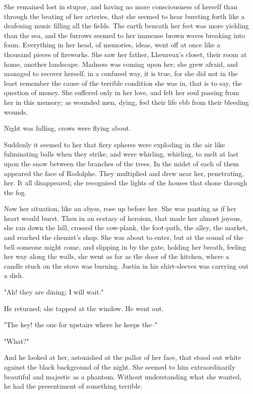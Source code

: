 \documentclass{tufte-book}
\begin{document}
She remained lost in stupor, and having no more consciousness of herself
than through the beating of her arteries, that she seemed to hear
bursting forth like a deafening music filling all the fields. The earth
beneath her feet was more yielding than the sea, and the furrows seemed
to her immense brown waves breaking into foam. Everything in her
head, of memories, ideas, went off at once like a thousand pieces of
fireworks. She saw her father, Lheureux's closet, their room at home,
another landscape. Madness was coming upon her; she grew afraid, and
managed to recover herself, in a confused way, it is true, for she did
not in the least remember the cause of the terrible condition she was
in, that is to say, the question of money. She suffered only in her
love, and felt her soul passing from her in this memory; as wounded men,
dying, feel their life ebb from their bleeding wounds.

Night was falling, crows were flying about.

Suddenly it seemed to her that fiery spheres were exploding in the air
like fulminating balls when they strike, and were whirling, whirling,
to melt at last upon the snow between the branches of the trees. In the
midst of each of them appeared the face of Rodolphe. They multiplied and
drew near her, penetrating, her. It all disappeared; she recognised the
lights of the houses that shone through the fog.

Now her situation, like an abyss, rose up before her. She was panting as
if her heart would burst. Then in an ecstasy of heroism, that made
her almost joyous, she ran down the hill, crossed the cow-plank, the
foot-path, the alley, the market, and reached the chemist's shop. She
was about to enter, but at the sound of the bell someone might come, and
slipping in by the gate, holding her breath, feeling her way along the
walls, she went as far as the door of the kitchen, where a candle stuck
on the stove was burning. Justin in his shirt-sleeves was carrying out a
dish.

"Ah! they are dining; I will wait."

He returned; she tapped at the window. He went out.

"The key! the one for upstairs where he keeps the--"

"What?"

And he looked at her, astonished at the pallor of her face, that stood
out white against the black background of the night. She seemed to
him extraordinarily beautiful and majestic as a phantom. Without
understanding what she wanted, he had the presentiment of something
terrible.
\end{document}
